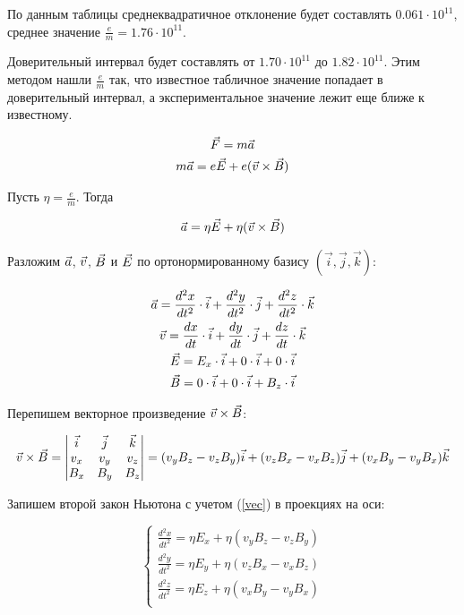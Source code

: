 По данным таблицы среднеквадратичное отклонение будет составлять $0.061\cdot10^{11}$, среднее значение $\frac{e}{m}=1.76\cdot10^{11}$.

Доверительный интервал будет составлять от $1.70\cdot10^{11}$ до $1.82\cdot10^{11}$. Этим методом нашли $\frac{e}{m}$ так, что известное табличное значение попадает в доверительный интервал, а экспериментальное значение лежит еще ближе к известному.

\begin{gather}
	\vec{F}=m\vec{a}\\
	m\vec{a}=e\vec{E}+e(\vec{v}\times\vec{B})
\end{gather}

Пусть $\eta=\frac{e}{m}$. Тогда

\begin{gather}
	\vec{a}=\eta\vec{E}+\eta(\vec{v}\times\vec{B})
\end{gather}

Разложим $\vec{a}$, $\vec{v}$, $\vec{B}$ и $\vec{E}$ по ортонормированному базису $(\vec{i},\vec{j},\vec{k})$:

\begin{gather}
	\vec{a}=\frac{d^2x}{dt^2}\cdot\vec{i}+\frac{d^2y}{dt^2}\cdot\vec{j}+\frac{d^2z}{dt^2}\cdot\vec{k}\\
	\vec{v}=\frac{dx}{dt}\cdot\vec{i}+\frac{dy}{dt}\cdot\vec{j}+\frac{dz}{dt}\cdot\vec{k}\\
	\vec{E}=E_x\cdot\vec{i}+0\cdot\vec{i}+0\cdot\vec{i}\\
	\vec{B}=0\cdot\vec{i}+0\cdot\vec{i}+B_z\cdot\vec{i}
\end{gather}

Перепишем векторное произведение $\vec{v}\times\vec{B}$:

\begin{gather}
	\label{vec}
	\vec{v}\times\vec{B} = \begin{vmatrix} \vec{i} & \vec{j} & \vec{k} \\ v_x & v_y & v_z \\ B_x & B_y & B_z \end{vmatrix}=(v_yB_z-v_zB_y)\vec{i}+(v_zB_x-v_xB_z)\vec{j}+(v_xB_y-v_yB_x)\vec{k}
\end{gather}

Запишем второй закон Ньютона с учетом (\ref{vec}) в проекциях на оси:

\begin{equation}
\label{ma_xyz}
 \begin{cases}
   \frac{d^2x}{dt^2}=\eta{}E_x+\eta(v_yB_z-v_zB_y)\\
   \frac{d^2y}{dt^2}=\eta{}E_y+\eta(v_zB_x-v_xB_z)\\
   \frac{d^2z}{dt^2}=\eta{}E_z+\eta(v_xB_y-v_yB_x)\\
 \end{cases}
\end{equation}

